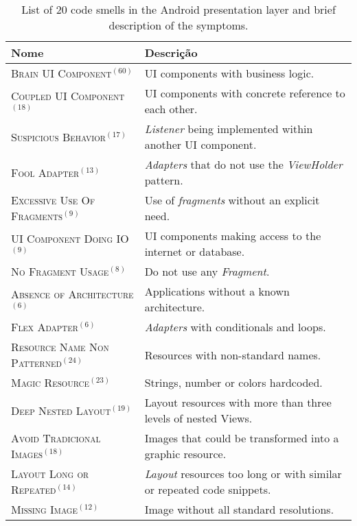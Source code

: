 \begin{table*}[htb!]
\centering
\renewcommand*{\arraystretch}{1}
\caption{List of 20 code smells in the Android presentation layer and brief description of the symptoms.}
\footnotesize
\begin{tabular}{@{}p{6.6cm}@{}p{10cm}@{}}
\toprule
\textbf{Nome} & \textbf{Descrição} \\
\toprule
\textsc{Brain UI Component}$^{(60)}$            & UI components with business logic.  \\
\textsc{Coupled UI Component}$^{(18)}$           & UI components with concrete reference to each other.  \\
\textsc{Suspicious Behavior}$^{(17)}$              & \textit{Listener} being implemented within another UI component.  \\
\textsc{Fool Adapter}$^{(13)}$                  & \textit{Adapters} that do not use the \textit{ViewHolder} pattern.  \\
\textsc{Excessive Use Of Fragments}$^{(9)}$           & Use of \textit{fragments} without an explicit need. \\
\textsc{UI Component Doing IO}$^{(9)}$          & UI components making access to the internet or database.  \\
\textsc{No Fragment Usage}$^{(8)}$                  & Do not use any \textit{Fragment}.  \\
\textsc{Absence of Architecture}$^{(6)}$              & Applications without a known architecture.  \\
\textsc{Flex Adapter}$^{(6)}$                     & \textit{Adapters} with conditionals and loops. \\
\textsc{Resource Name Non Patterned}$^{(24)}$      & Resources with non-standard names.      \\
\textsc{Magic Resource}$^{(23)}$                      & Strings, number or colors hardcoded.   \\
\textsc{Deep Nested Layout}$^{(19)}$            & Layout resources with more than three levels of nested Views.   \\
\textsc{Avoid Tradicional Images}$^{(18)}$      & Images that could be transformed into a graphic resource.   \\
\textsc{Layout Long or Repeated}$^{(14)}$            & \textit{Layout} resources too long or with similar or repeated code snippets.   \\
\textsc{Missing Image}$^{(12)}$                     & Image without all standard resolutions.   \\

\end{tabular}
\end{table*}
